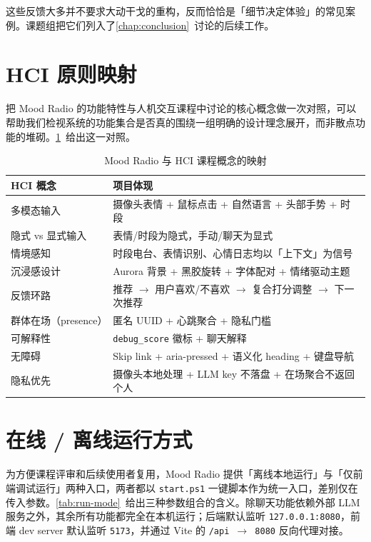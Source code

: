 这些反馈大多并不要求大动干戈的重构，反而恰恰是「细节决定体验」的常见案例。课题组把它们列入了\cref{chap:conclusion}~讨论的后续工作。

\section{HCI 原则映射}

把 Mood Radio 的功能特性与人机交互课程中讨论的核心概念做一次对照，可以帮助我们检视系统的功能集合是否真的围绕一组明确的设计理念展开，而非散点功能的堆砌。\cref{tab:hci-mapping}~给出这一对照。

\begin{table}[!htb]
  \centering
  \caption{Mood Radio 与 HCI 课程概念的映射}\label{tab:hci-mapping}
  \begin{tabularx}{\linewidth}{lX}
    \toprule
    \textbf{HCI 概念} & \textbf{项目体现} \\
    \midrule
    多模态输入       & 摄像头表情 + 鼠标点击 + 自然语言 + 头部手势 + 时段 \\
    隐式 vs 显式输入 & 表情/时段为隐式，手动/聊天为显式 \\
    情境感知         & 时段电台、表情识别、心情日志均以「上下文」为信号 \\
    沉浸感设计       & Aurora 背景 + 黑胶旋转 + 字体配对 + 情绪驱动主题 \\
    反馈环路         & 推荐 $\to$ 用户喜欢/不喜欢 $\to$ 复合打分调整 $\to$ 下一次推荐 \\
    群体在场（presence） & 匿名 UUID + 心跳聚合 + 隐私门槛 \\
    可解释性         & \texttt{debug\_score} 徽标 + 聊天解释 \\
    无障碍           & Skip link + aria-pressed + 语义化 heading + 键盘导航 \\
    隐私优先         & 摄像头本地处理 + LLM key 不落盘 + 在场聚合不返回个人 \\
    \bottomrule
  \end{tabularx}
\end{table}

\section{在线 / 离线运行方式}

为方便课程评审和后续使用者复用，Mood Radio 提供「离线本地运行」与「仅前端调试运行」两种入口，两者都以 \texttt{start.ps1} 一键脚本作为统一入口，差别仅在传入参数。\cref{tab:run-mode}~给出三种参数组合的含义。除聊天功能依赖外部 LLM 服务之外，其余所有功能都完全在本机运行；后端默认监听 \texttt{127.0.0.1:8080}，前端 dev server 默认监听 \texttt{5173}，并通过 Vite 的 \texttt{/api $\to$ 8080} 反向代理对接。

